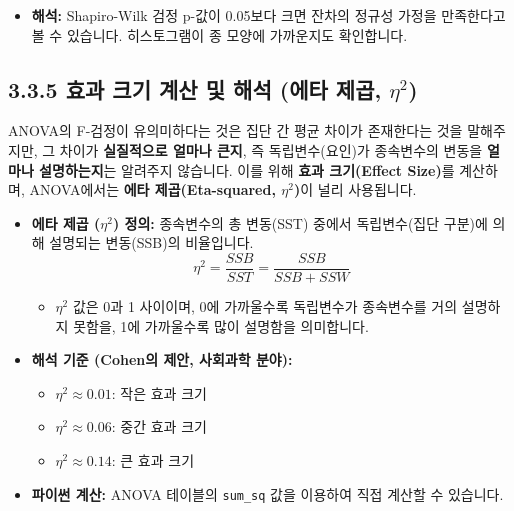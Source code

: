 \documentclass[
  letterpaper,
]{book}
\providecommand{\tightlist}{%
  \setlength{\itemsep}{0pt}\setlength{\parskip}{0pt}}
\begin{document}
\begin{itemize}
\tightlist
\item
  \textbf{해석:} Shapiro-Wilk 검정 p-값이 0.05보다 크면 잔차의 정규성
  가정을 만족한다고 볼 수 있습니다. 히스토그램이 종 모양에 가까운지도
  확인합니다.
\end{itemize}

\subsection{\texorpdfstring{3.3.5 효과 크기 계산 및 해석 (에타 제곱,
\(\eta^2\))}{3.3.5 효과 크기 계산 및 해석 (에타 제곱, \textbackslash eta\^{}2)}}\label{uxd6a8uxacfc-uxd06cuxae30-uxacc4uxc0b0-uxbc0f-uxd574uxc11d-uxc5d0uxd0c0-uxc81cuxacf1-eta2}

ANOVA의 F-검정이 유의미하다는 것은 집단 간 평균 차이가 존재한다는 것을
말해주지만, 그 차이가 \textbf{실질적으로 얼마나 큰지}, 즉
독립변수(요인)가 종속변수의 변동을 \textbf{얼마나 설명하는지}는 알려주지
않습니다. 이를 위해 \textbf{효과 크기(Effect Size)}를 계산하며,
ANOVA에서는 \textbf{에타 제곱(Eta-squared, \(\eta^2\))}이 널리
사용됩니다.

\begin{itemize}
\tightlist
\item
  \textbf{에타 제곱 (\(\eta^2\)) 정의:} 종속변수의 총 변동(SST) 중에서
  독립변수(집단 구분)에 의해 설명되는 변동(SSB)의 비율입니다.
  \[\eta^2 = \frac{SSB}{SST} = \frac{SSB}{SSB + SSW}\]

  \begin{itemize}
  \tightlist
  \item
    \(\eta^2\) 값은 0과 1 사이이며, 0에 가까울수록 독립변수가 종속변수를
    거의 설명하지 못함을, 1에 가까울수록 많이 설명함을 의미합니다.
  \end{itemize}
\item
  \textbf{해석 기준 (Cohen의 제안, 사회과학 분야):}

  \begin{itemize}
  \tightlist
  \item
    \(\eta^2 \approx 0.01\): 작은 효과 크기
  \item
    \(\eta^2 \approx 0.06\): 중간 효과 크기
  \item
    \(\eta^2 \approx 0.14\): 큰 효과 크기
  \end{itemize}
\item
  \textbf{파이썬 계산:} ANOVA 테이블의 \texttt{sum\_sq} 값을 이용하여
  직접 계산할 수 있습니다.
\end{itemize}
\end{document}
